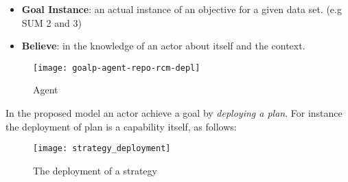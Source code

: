 \begin{itemize}

\item \textbf{Goal Instance}: an actual instance of an objective for a given data set. (e.g SUM 2 and 3)

\item \textbf{Believe}: in the knowledge of an actor about itself and the context.

\end{itemize}

\begin{figure}
  \centering
  \texttt{[image: goalp-agent-repo-rcm-depl]}
  \caption{Agent}
  \label{fig:goalp-agent}
\end{figure}

In the proposed model an actor achieve a goal by \emph{deploying a plan}. For instance the deployment of plan is a capability itself, as follows:

\begin{figure}
  \centering
  \texttt{[image: strategy\_deployment]}
  \caption{The deployment of a strategy}
  \label{fig:agent_composition}
\end{figure}



%
%
%
%
%
%
%
